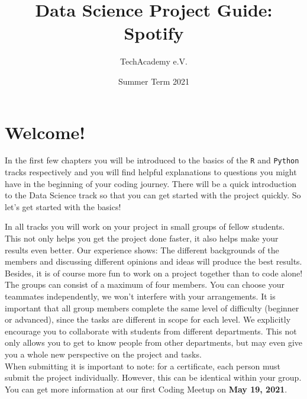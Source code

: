 \documentclass[
  11pt,
]{book}
\title{Data Science Project Guide: Spotify}
\author{TechAcademy e.V.}
\date{Summer Term 2021}
\begin{document}
\maketitle

\clearpage

\addtolength{\headheight}{17.82275pt}

\fancyfoot{}
\fancyfoot[R]{\thepage}
\addtolength{\headheight}{17.82275pt}


\renewcommand{\headrulewidth}{0.25pt}
\renewcommand{\footrulewidth}{0.25pt}

\tableofcontents
\clearpage

\hypertarget{welcome}{%
\chapter{Welcome!}\label{welcome}}

In the first few chapters you will be introduced to the basics of the \texttt{R} and \texttt{Python} tracks respectively and you will find helpful explanations to questions you might have in the beginning of your coding journey. There will be a quick introduction to the Data Science track so that you can get started with the project quickly. So let's get started with the basics!

In all tracks you will work on your project in small groups of fellow students. This not only helps you get the project done faster, it also helps make your results even better. Our experience shows: The different backgrounds of the members and discussing different opinions and ideas will produce the best results. Besides, it is of course more fun to work on a project together than to code alone!\\
The groups can consist of a maximum of four members. You can choose your teammates independently, we won't interfere with your arrangements. It is important that all group members complete the same level of difficulty (beginner or advanced), since the tasks are different in scope for each level. We explicitly encourage you to collaborate with students from different departments. This not only allows you to get to know people from other departments, but may even give you a whole new perspective on the project and tasks.\\
When submitting it is important to note: for a certificate, each person must submit the project individually. However, this can be identical within your group. You can get more information at our first Coding Meetup on \textbf{May 19, 2021}.
\end{document}
